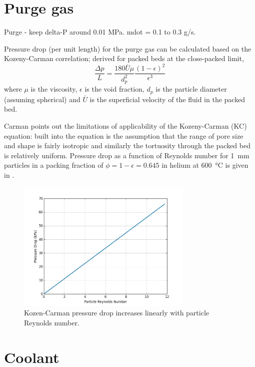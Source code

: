 \documentclass[11pt]{report} %
\begin{document}
\section{Purge gas}
Purge - keep delta-P around 0.01 MPa. mdot = 0.1 to 0.3 g/s.

Pressure drop (per unit length) for the purge gas can be calculated based on the Kozeny-Carman correlation; derived for packed beds at the close-packed limit,
\begin{equation}\label{eq:K-C-pressure}
    \frac{\Delta p}{L} = \frac{180 \bar{U} \mu}{d_p^2} \frac{(1-\epsilon)^2}{\epsilon^3}
\end{equation}
where $\mu$ is the viscosity, $\epsilon$ is the void fraction, $d_p$ is the particle diameter (assuming spherical) and $\bar{U}$ is the superficial velocity of the fluid in the packed bed.

Carman points out the limitations of applicability of the Kozeny-Carman (KC) equation: built into the equation is the assumption that the range of pore size and shape is fairly isotropic and similarly the tortuosity through the packed bed is relatively uniform. Pressure drop as a function of Reynolds number for \SI{1}{\milli\meter} particles in a packing fraction of $\phi = 1-\epsilon = 0.645$ in helium at \SI{600}{\celsius} is given in .

\begin{figure}[ht]
    \centering
    \includegraphics[width=0.75\textwidth]{images/KC-pressure-drop}
    \caption{Kozen-Carman pressure drop increases linearly with particle Reynolds number.}
    \label{fig:KC-pressure-drop}
\end{figure}

\section{Coolant}
\end{document}
